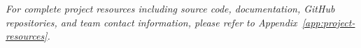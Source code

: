 \noindent\textit{For complete project resources including source code, documentation, GitHub repositories, and team contact information, please refer to Appendix~\ref{app:project-resources}.}



